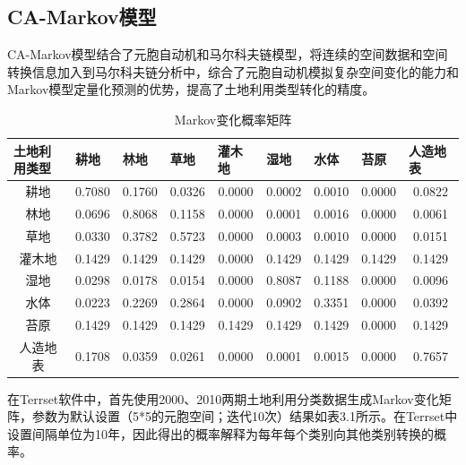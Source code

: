 \documentclass[10pt,aspectratio=169]{beamer} %
\begin{document}
	\subsection{CA-Markov模型}
	\begin{frame}[c]{\secname}{\subsecname}
	CA-Markov模型结合了元胞自动机和马尔科夫链模型，将连续的空间数据和空间转换信息加入到马尔科夫链分析中，综合了元胞自动机模拟复杂空间变化的能力和Markov模型定量化预测的优势，提高了土地利用类型转化的精度\cite{sangSimulationLandUse2011,hamad2018predicting,subedi2013application}。	
	\begin{table}[htbp]
		\centering
		\begin{tabular}{ccccccccc}
			\hline
			\multicolumn{1}{l}{土地利用类型} &
			\multicolumn{1}{l}{耕地} &
			\multicolumn{1}{l}{林地} &
			\multicolumn{1}{l}{草地} &
			\multicolumn{1}{l}{灌木地} &
			\multicolumn{1}{l}{湿地} &
			\multicolumn{1}{l}{水体} &
			\multicolumn{1}{l}{苔原} &
			\multicolumn{1}{l}{人造地表}
			\\
			\hline
			耕地 &
			0.7080  &
			0.1760  &
			0.0326  &
			0.0000  &
			0.0002  &
			0.0010  &
			0.0000  &
			0.0822 
			\\
			林地 &
			0.0696  &
			0.8068  &
			0.1158  &
			0.0000  &
			0.0001  &
			0.0016  &
			0.0000  &
			0.0061 
			\\
			草地 &
			0.0330  &
			0.3782  &
			0.5723  &
			0.0000  &
			0.0003  &
			0.0010  &
			0.0000  &
			0.0151 
			\\
			灌木地 &
			0.1429  &
			0.1429  &
			0.1429  &
			0.0000  &
			0.1429  &
			0.1429  &
			0.1429  &
			0.1429 
			\\
			湿地 &
			0.0298  &
			0.0178  &
			0.0154  &
			0.0000  &
			0.8087  &
			0.1188  &
			0.0000  &
			0.0096 
			\\
			水体 &
			0.0223  &
			0.2269  &
			0.2864  &
			0.0000  &
			0.0902  &
			0.3351  &
			0.0000  &
			0.0392 
			\\
			苔原 &
			0.1429  &
			0.1429  &
			0.1429  &
			0.1429  &
			0.1429  &
			0.1429  &
			0.0000  &
			0.1429 
			\\
			人造地表 &
			0.1708  &
			0.0359  &
			0.0261  &
			0.0000  &
			0.0001  &
			0.0015  &
			0.0000  &
			0.7657 
			\\
			\hline
		\end{tabular}%
	\label{Table.2}
		\caption{Markov变化概率矩阵}
	\end{table}%
\qquad 在Terrset软件中，首先使用2000、2010两期土地利用分类数据生成Markov变化矩阵，参数为默认设置（5*5的元胞空间；迭代10次）结果如表3.1所示。在Terrset中设置间隔单位为10年，因此得出的概率解释为每年每个类别向其他类别转换的概率。
	\end{frame}
\end{document}
